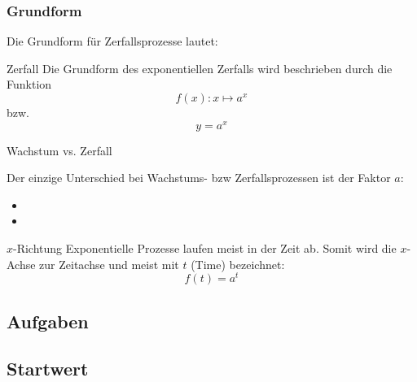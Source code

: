 \subsubsection{Grundform} 
Die Grundform für Zerfallsprozesse lautet:

\begin{definition}{Zerfall}{}
  Die Grundform des exponentiellen Zerfalls wird beschrieben durch die Funktion
$$f(x): x \mapsto a^x$$
  bzw.
  $$y = a^x$$
\end{definition}


\begin{gesetz}{Wachstum vs. Zerfall}{}

  Der einzige Unterschied bei Wachstums- bzw Zerfallsprozessen ist der
  Faktor $a$:

  \begin{itemize}
    \item {}\vspace{3mm}
    \item {}
  \end{itemize}
  
\end{gesetz}

\begin{bemerkung}{$x$-Richtung}{}
  Exponentielle Prozesse laufen meist in der Zeit ab. Somit wird
  die $x$-Achse zur Zeitachse und meist mit $t$ (Time) bezeichnet:
  $$f(t) = a^t$$
  \end{bemerkung}


\subsection*{Aufgaben}



%
\newpage


\subsection{Startwert}

